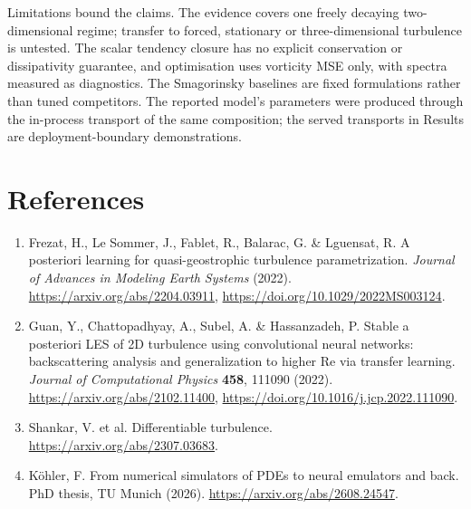\documentclass[10pt]{article}
\begin{document}
Limitations bound the claims. The evidence covers one freely decaying two-dimensional regime; transfer to forced, stationary or three-dimensional turbulence is untested. The scalar tendency closure has no explicit conservation or dissipativity guarantee, and optimisation uses vorticity MSE only, with spectra measured as diagnostics. The Smagorinsky baselines are fixed formulations rather than tuned competitors. The reported model's parameters were produced through the in-process transport of the same composition; the served transports in Results are deployment-boundary demonstrations.

\section*{References}

\begin{enumerate}
  \item Frezat, H., Le Sommer, J., Fablet, R., Balarac, G. \& Lguensat, R. A posteriori learning for quasi-geostrophic turbulence parametrization. \emph{Journal of Advances in Modeling Earth Systems} (2022). \url{https://arxiv.org/abs/2204.03911}, \url{https://doi.org/10.1029/2022MS003124}.
  \item Guan, Y., Chattopadhyay, A., Subel, A. \& Hassanzadeh, P. Stable a posteriori LES of 2D turbulence using convolutional neural networks: backscattering analysis and generalization to higher Re via transfer learning. \emph{Journal of Computational Physics} \textbf{458}, 111090 (2022). \url{https://arxiv.org/abs/2102.11400}, \url{https://doi.org/10.1016/j.jcp.2022.111090}.
  \item Shankar, V. et al. Differentiable turbulence. \url{https://arxiv.org/abs/2307.03683}.
  \item K\"ohler, F. From numerical simulators of PDEs to neural emulators and back. PhD thesis, TU Munich (2026). \url{https://arxiv.org/abs/2608.24547}.
\end{enumerate}
\end{document}

